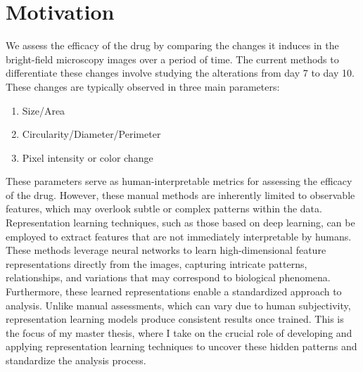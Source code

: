 \chapter{Motivation} \label{chapter:Motivation} 

We assess the efficacy of the drug by comparing the changes it induces in the bright-field microscopy images over a period of time. 
The current methods to differentiate these changes involve studying the alterations from day 7 to day 10. These changes are typically
observed in three main parameters: 
\begin{enumerate}[itemsep=0.2em, parsep=0pt]
  \item Size/Area
  \item Circularity/Diameter/Perimeter
  \item Pixel intensity or color change
\end{enumerate}
These parameters serve as human-interpretable metrics for assessing the efficacy of the drug. However, these manual methods are inherently limited to
observable features, which may overlook subtle or complex patterns within the data. Representation learning techniques, such as those based on deep learning, can be employed to extract features that are not immediately interpretable by 
humans. These methods leverage neural networks to learn high-dimensional feature representations directly from the images, capturing intricate patterns, 
relationships, and variations that may correspond to biological phenomena. Furthermore, these learned representations enable a standardized approach to analysis. Unlike manual assessments, which can vary due to human subjectivity,
representation learning models produce consistent results once trained. This is the focus of my master thesis, where I take on the crucial role of developing and applying representation learning techniques to uncover these
hidden patterns and standardize the analysis process.

\let\cleardoublepage\clearpage

